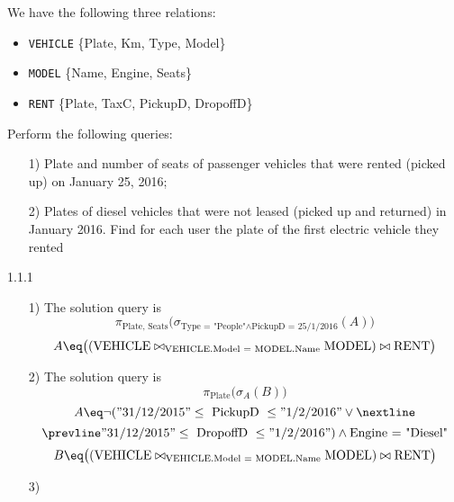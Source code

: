 \begin{exercise}
    We have the following three relations:
    \begin{itemize}
        \item \texttt{VEHICLE} \{Plate, Km, Type, Model\}
        \item \texttt{MODEL} \{Name, Engine, Seats\}
        \item \texttt{RENT} \{Plate, TaxC, PickupD, DropoffD\}
    \end{itemize}

    Perform the following queries:
    \begin{itemize}
        \item [1)] Plate and number of seats of passenger vehicles that were rented (picked up) on January 25, 2016;
        \item [2)] Plates of diesel vehicles that were not leased (picked up and returned) in January 2016. Find for each user the plate of the first electric vehicle they rented
    \end{itemize}
    \vspace{12pt}
\end{exercise}
\begin{solution}{1.1.1}
    \begin{itemize}
        \item [1)] The solution query is
        \[ \pi_{\text{Plate, Seats}} \big( \sigma_{\text{Type = "People"} \wedge \text{PickupD = 25/1/2016}} (A) \big)\]
        \[ A \eq \big((\text{VEHICLE} \bowtie_{\text{VEHICLE.Model = MODEL.Name}} \text{MODEL}) \bowtie \text{RENT} \big) \]
        \item [2)] The solution query is
        \[ \pi_{\text{Plate}} \big( \sigma_{A} (B) \big) \]
        \[ A \eq \neg ("31/12/2015" \leq \text{ PickupD } \leq "1/2/2016" \vee \nextline \]
        \[ \prevline "31/12/2015" \leq \text{ DropoffD } \leq "1/2/2016") \wedge \text{Engine = "Diesel"} \]
        \[ B \eq \big((\text{VEHICLE} \bowtie_{\text{VEHICLE.Model = MODEL.Name}} \text{MODEL}) \bowtie \text{RENT} \big) \]
        \item [3)] 
    \end{itemize}
\end{solution}